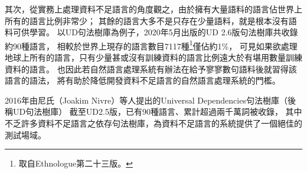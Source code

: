 其次，從實務上處理資料不足語言的角度觀之，由於擁有大量語料的語言佔世界上所有的語言比例非常少；
其餘的語言大多不是只存在少量語料，就是根本沒有語料可供學習。
以UD句法樹庫為例子，2020年5月出版的UD 2.6版句法樹庫共收錄約90種語言，
相較於世界上現存的語言數目7117種\footnote{取自Ethnologue第二十三版\cite{eberhard2020ethnologue}。}僅佔約1\%，
可見如果欲處理地球上所有的語言，只有少量甚或沒有訓練資料的語言比例遠大於有堪用數量訓練資料的語言。
也因此若自然語言處理系統有辦法在給予寥寥數句語料後就習得該語言的語法，
將有助於降低開發資料不足語言的自然語言處理系統的門檻。

\iffalse
原因有兩點：
然而多語言訓練的目標，是提高訓練語言（training languages）在其測試集（testing set）上的準確率，
而提高訓練語言的準確率，未必就代表在資料不足語言上的準確率也會隨之提高；
有可能出現訓練語言與資料不足語言差異過大，而導致多語言訓練模型無法幫助資料不足語言的任務表現。
芬氏（Chelsea Finn）在2018年提出的模型無關元學習（model-agnostic meta-learning）
\cite{Finn2017ModelAgnosticMF}為所有使用梯度下降法（gradient descent）進行最佳化的模型的提供了一項簡潔且有效的方法處理資料不足任務。
在語言轉移學習的框架下，其目標是替未見過的語言（unseen languages）尋找一合適參數初始值，使得少量步數梯度更新後，參數在該語言的測試集上表現最佳。
其強調使用少量步數進行梯度更新，即是由於資料不足語言資料稀少，過多步數容易過擬合。
不若單純的多語言訓練，模型無關元學習於訓練階段的目標並非提高在訓練語言上的表現，
而是直接最佳化模型在未見過語言上調適（fine-tuning）後的表現，訓練與測試環境沒有不匹配之處，
有效防止模型只在訓練語言的測試集上有好表現，而無法推廣到資料不足語言上的問題。
\fi

2016年由尼氏（Joakim Nivre）等人提出的Universal Dependencies句法樹庫\cite{Nivre2016UniversalDV}（後稱UD句法樹庫）
截至UD2.5版，已有90種語言、累計超過兩千萬詞被收錄\cite{Nivre2020UniversalDV}，
其中不乏許多資料不足語言之依存句法樹庫，為資料不足語言的系統提供了一個絕佳的測試場域。

